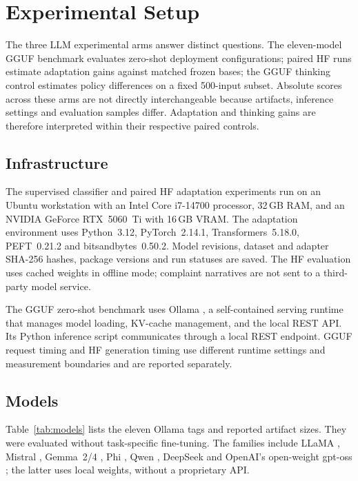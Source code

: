 \documentclass[pdflatex,sn-mathphys-num]{sn-jnl}
\begin{document}
\section{Experimental Setup}
\label{sec:setup}

The three LLM experimental arms answer distinct questions. The
eleven-model GGUF benchmark evaluates zero-shot deployment configurations; paired HF
runs estimate adaptation gains against matched frozen bases; the GGUF
thinking control estimates policy differences on a fixed 500-input
subset. Absolute scores across these arms are not directly
interchangeable because artifacts, inference settings and evaluation
samples differ. Adaptation and thinking gains are therefore interpreted
within their respective paired controls.

\subsection{Infrastructure}

The supervised classifier and paired HF adaptation experiments run on an
Ubuntu workstation with an Intel Core i7-14700 processor, 32\,GB RAM,
and an NVIDIA GeForce RTX~5060~Ti with 16\,GB VRAM. The adaptation
environment uses Python~3.12, PyTorch~2.14.1, Transformers~5.18.0,
PEFT~0.21.2 and bitsandbytes~0.50.2. Model revisions, dataset and adapter
SHA-256 hashes, package versions and run statuses are saved. The HF
evaluation uses cached weights in offline mode; complaint narratives
are not sent to a third-party model service.

The GGUF zero-shot benchmark uses Ollama \cite{ollama2026docs}, a self-contained serving runtime
that manages model loading, KV-cache management, and the local REST API.
Its Python inference script communicates through a local REST endpoint.
GGUF request timing and HF generation timing use different runtime
settings and measurement boundaries and are reported separately.

\subsection{Models}

Table~\ref{tab:models} lists the eleven Ollama tags and reported
artifact sizes. They were evaluated without task-specific fine-tuning.
The families include LLaMA \cite{grattafiori2024llama3}, Mistral
\cite{jiang2023mistral}, Gemma~2/4 \cite{team2024gemma2,google2026gemma4card}, Phi
\cite{abdin2024phi4}, Qwen \cite{qwen2025qwen3}, DeepSeek
\cite{deepseekllm2024,guo2025deepseekr1} and OpenAI's open-weight
gpt-oss \cite{openai2025gptoss}; the latter uses local weights, without
a proprietary API.
\end{document}
